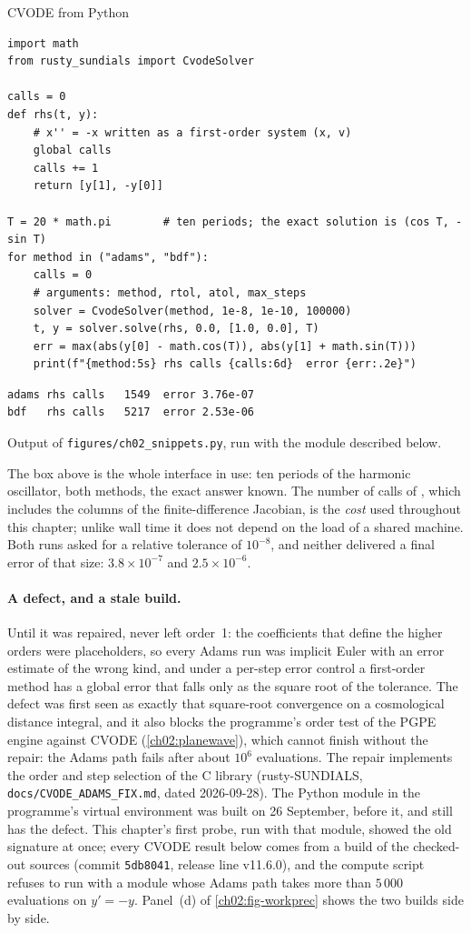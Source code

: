 \begin{rustbox}{CVODE from Python}
\begin{lstlisting}[style=py]
import math
from rusty_sundials import CvodeSolver

calls = 0
def rhs(t, y):
    # x'' = -x written as a first-order system (x, v)
    global calls
    calls += 1
    return [y[1], -y[0]]

T = 20 * math.pi        # ten periods; the exact solution is (cos T, -sin T)
for method in ("adams", "bdf"):
    calls = 0
    # arguments: method, rtol, atol, max_steps
    solver = CvodeSolver(method, 1e-8, 1e-10, 100000)
    t, y = solver.solve(rhs, 0.0, [1.0, 0.0], T)
    err = max(abs(y[0] - math.cos(T)), abs(y[1] + math.sin(T)))
    print(f"{method:5s} rhs calls {calls:6d}  error {err:.2e}")
\end{lstlisting}
\begin{lstlisting}[style=plainmono]
adams rhs calls   1549  error 3.76e-07
bdf   rhs calls   5217  error 2.53e-06
\end{lstlisting}
Output of \texttt{figures/ch02\_snippets.py}, run with the module described below.
\end{rustbox}

The box above is the whole interface in use: ten periods of the harmonic oscillator, both methods, the exact answer known. The number of calls of , which includes the columns
of the finite-difference Jacobian, is the \emph{cost} used throughout this chapter; unlike wall time it does not depend on the load of a shared machine. Both runs asked for a relative tolerance of $10^{-8}$,
and neither delivered a final error of that size: $3.8\times10^{-7}$ and $2.5\times10^{-6}$.

\paragraph{A defect, and a stale build.} Until it was repaired,  never left order~1: the coefficients that define the higher orders were placeholders, so every Adams run was implicit Euler
with an error estimate of the wrong kind, and under a per-step error control a first-order method has a global error that falls only as the square root of the tolerance. The defect was first seen as exactly that
square-root convergence on a cosmological distance integral, and it also blocks the programme's order test of the PGPE engine against CVODE (\cref{ch02:planewave}), which cannot finish without the repair: the Adams path
fails after about $10^6$ evaluations. The repair implements the order and step selection of the C library (rusty-SUNDIALS, \texttt{docs/CVODE\_ADAMS\_FIX.md}, dated 2026-09-28). The Python module in the
programme's virtual environment was built on 26 September, before it, and still has the defect. This chapter's first probe, run with that module, showed the old signature at once; every CVODE result below comes from a build of the checked-out
sources (commit \texttt{5db8041}, release line v11.6.0), and the compute script refuses to run with a module whose Adams path takes more than $5\,000$ evaluations on $y'=-y$.
Panel~(d) of \cref{ch02:fig-workprec} shows the two builds side by side.

